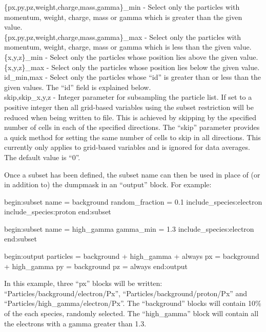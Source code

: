 {\emphtext \{px,py,pz,weight,charge,mass,gamma\}\_min} - Select only the
  particles with momentum, weight, charge, mass or gamma which is greater
  than the given value.\\

{\emphtext \{px,py,pz,weight,charge,mass,gamma\}\_max} - Select only the
  particles with momentum, weight, charge, mass or gamma which is less
  than the given value.\\

{\emphtext \{x,y,z\}\_min} - Select only the particles whose position lies
  above the given value.\\

{\emphtext \{x,y,z\}\_max} - Select only the particles whose position lies
  below the given value.\\

{\emphtext id\_{min,max}} - Select only the particles whose ``id'' is greater
  than or less than the given values. The ``id'' field is explained below.\\

{\emphtext skip,skip\_{x,y,z}} - Integer parameter for subsampling the particle
  list. If set to a positive integer then all grid-based variables using the
  subset restriction will be reduced when being written to file. This is
  achieved by skipping by the specified number of cells in each of the
  specified directions. The ``skip'' parameter provides a quick method for
  setting the same number of cells to skip in all directions.
  This currently only applies to grid-based variables and is ignored for
  data averages. The default value is ``0''.

Once a subset has been defined, the subset name can then be used in place of
(or in addition to) the dumpmask in an ``output'' block. For example:
{\samepage
\begin{boxverbatim}
begin:subset
   name = background
   random_fraction = 0.1
   include_species:electron
   include_species:proton
end:subset

begin:subset
   name = high_gamma
   gamma_min = 1.3
   include_species:electron
end:subset

begin:output
   particles = background + high_gamma + always
   px = background + high_gamma
   py = background
   pz = always
end:output
\end{boxverbatim}
}

In this example, three ``px'' blocks will be written:
``Particles/background/electron/Px'', ``Particles/background/proton/Px''
and ``Particles/high\_gamma/electron/Px''.
The ``background'' blocks will contain 10\% of the each species, randomly
selected.
The ``high\_gamma'' block will contain all the electrons with a gamma
greater than 1.3.

